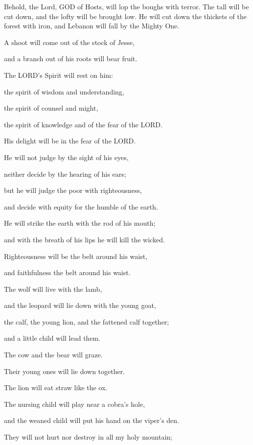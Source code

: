 \myverse{}Behold, the Lord, GOD of Hosts, will lop the boughs with terror.
The tall will be cut down, and the lofty will be brought low.
\myverse{}He will cut down the thickets of the forest with iron, and Lebanon will fall
by the Mighty One.


\mychapter{} \myverse*{}A shoot will come out of the stock of Jesse,

\quad and a branch out of his roots will bear fruit.

\myverse{}The LORD’s Spirit will rest on him:

the spirit of wisdom and understanding,

the spirit of counsel and might,

the spirit of knowledge and of the fear of the LORD.

\myverse{}His delight will be in the fear of the LORD.

He will not judge by the sight of his eyes,

neither decide by the hearing of his ears;

\myverse{}but he will judge the poor with righteousness,

and decide with equity for the humble of the earth.

He will strike the earth with the rod of his mouth;

and with the breath of his lips he will kill the wicked.

\myverse{}Righteousness will be the belt around his waist,

and faithfulness the belt around his waist.


\vspace{\baselineskip} \myverse{}The wolf will live with the lamb,

and the leopard will lie down with the young goat,

the calf, the young lion, and the fattened calf together;

and a little child will lead them.

\myverse{}The cow and the bear will graze.

Their young ones will lie down together.

The lion will eat straw like the ox.

\myverse{}The nursing child will play near a cobra’s hole,

and the weaned child will put his hand on the viper’s den.

\myverse{}They will not hurt nor destroy in all my holy mountain;

